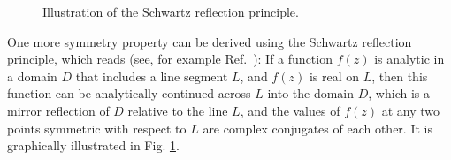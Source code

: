 \documentclass[12pt]{article}
\begin{document}
\begin{figure}
\centerline{}
\caption{\sf
Illustration of the Schwartz reflection principle.
}
\label{II.RS.fig.Schwartz}
\end{figure}

One more symmetry property can be derived using the Schwartz reflection
principle, which reads (see, for example Ref.~\cite{boas.cmplx}): If a function
$f(z)$ is analytic in a domain $D$ that includes a line segment $L$, and $f(z)$
is real on $L$, then this function can be analytically continued across $L$ into
the domain $\overline{D}$, which is a mirror reflection of $D$ relative to the
line $L$, and the values of $f(z)$ at any two points symmetric with respect to
$L$ are complex conjugates of each other. It is graphically illustrated in Fig.
\ref{II.RS.fig.Schwartz}.
\end{document}
